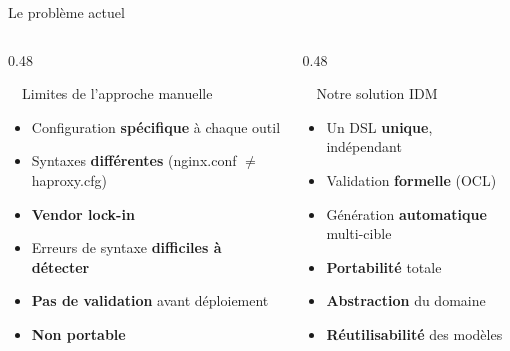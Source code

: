 \documentclass[aspectratio=169,12pt]{beamer}
\begin{document}
\begin{frame}{Le problème actuel}
\begin{columns}[T]
\begin{column}{0.48\textwidth}
\begin{alertblock}{\faExclamationTriangle\ \ Limites de l'approche manuelle}
\begin{itemize}
  \item Configuration \textbf{spécifique} à chaque outil
  \item Syntaxes \textbf{différentes} (nginx.conf $\neq$ haproxy.cfg)
  \item \textbf{Vendor lock-in}
  \item Erreurs de syntaxe \textbf{difficiles à détecter}
  \item \textbf{Pas de validation} avant déploiement
  \item \textbf{Non portable}
\end{itemize}
\end{alertblock}
\end{column}
\begin{column}{0.48\textwidth}
\begin{exampleblock}{\faCheckCircle\ \ Notre solution IDM}
\begin{itemize}
  \item Un DSL \textbf{unique}, indépendant
  \item Validation \textbf{formelle} (OCL)
  \item Génération \textbf{automatique} multi-cible
  \item \textbf{Portabilité} totale
  \item \textbf{Abstraction} du domaine
  \item \textbf{Réutilisabilité} des modèles
\end{itemize}
\end{exampleblock}
\end{column}
\end{columns}

\vspace{0.5em}
\begin{center}
\end{center}
\end{frame}
\end{document}
